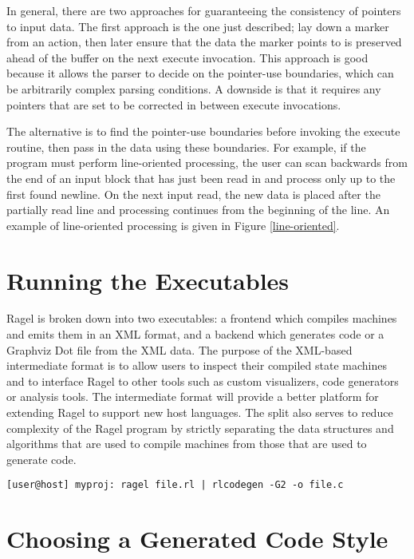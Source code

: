 \documentclass[letterpaper,11pt,oneside]{book}
\newcommand{\verbspace}{\vspace{10pt}}
\begin{document}
In general, there are two approaches for guaranteeing the consistency of
pointers to input data. The first approach is the one just described;
lay down a marker from an action,
then later ensure that the data the marker points to is preserved ahead of
the buffer on the next execute invocation. This approach is good because it
allows the parser to decide on the pointer-use boundaries, which can be
arbitrarily complex parsing conditions. A downside is that it requires any
pointers that are set to be corrected in between execute invocations.

The alternative is to find the pointer-use boundaries before invoking the execute
routine, then pass in the data using these boundaries. For example, if the
program must perform line-oriented processing, the user can scan backwards from
the end of an input block that has just been read in and process only up to the
first found newline. On the next input read, the new data is placed after the
partially read line and processing continues from the beginning of the line.
An example of line-oriented processing is given in Figure \ref{line-oriented}.


\section{Running the Executables}

Ragel is broken down into two executables: a frontend which compiles machines
and emits them in an XML format, and a backend which generates code or a
Graphviz Dot file from the XML data. The purpose of the XML-based intermediate
format is to allow users to inspect their compiled state machines and to
interface Ragel to other tools such as custom visualizers, code generators or
analysis tools. The intermediate format will provide a better platform for
extending Ragel to support new host languages. The split also serves to reduce
complexity of the Ragel program by strictly separating the data structures and
algorithms that are used to compile machines from those that are used to
generate code. 

\verbspace
\begin{verbatim}
[user@host] myproj: ragel file.rl | rlcodegen -G2 -o file.c
\end{verbatim}

\section{Choosing a Generated Code Style}
\label{genout}
\end{document}

